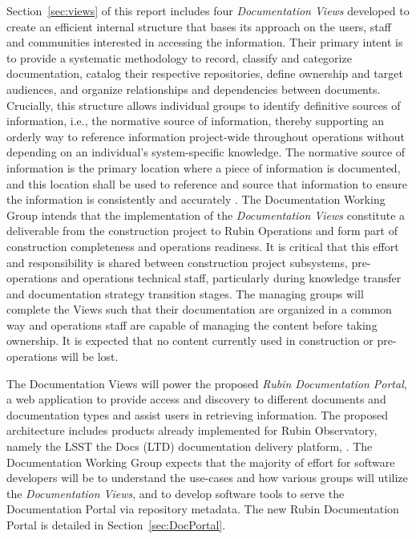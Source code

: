 Section~\ref{sec:views} of this report includes four \emph{Documentation Views} developed to create an efficient internal structure that bases its approach on the users, staff and communities interested in accessing the information.
Their primary intent is to provide a systematic methodology to record, classify and categorize documentation, catalog their respective repositories, define ownership and target audiences, and organize relationships and dependencies between documents.
Crucially, this structure allows individual groups to identify definitive sources of information, i.e., the normative source of information, thereby supporting an orderly way to reference information project-wide throughout operations without depending on an individual's system-specific knowledge.
The normative source of information is the primary location where a piece of information is documented, and this location shall be used to reference and source that information to ensure the information is consistently and accurately .
The Documentation Working Group intends that the implementation of the \emph{Documentation Views} constitute a deliverable from the construction project to Rubin Operations and form part of construction completeness and operations readiness.
It is critical that this effort and responsibility is shared between construction project subsystems, pre-operations and operations technical staff, particularly during knowledge transfer and documentation strategy transition stages.
The managing groups will complete the Views such that their documentation are organized in a common way and operations staff are capable of managing the content before taking ownership.
It is expected that no content currently used in construction or pre-operations will be lost.

The Documentation Views will power the proposed \emph{Rubin Documentation Portal}, a web application to provide access and discovery to different documents and documentation types and assist users in retrieving information.
The proposed architecture includes products already implemented for Rubin Observatory, namely the LSST the Docs (LTD) documentation delivery platform,  .
The Documentation Working Group expects that the majority of effort for software developers will be to understand the use-cases and how various groups will utilize the \emph{Documentation Views}, and to develop software tools to serve the Documentation Portal via repository metadata.
The new Rubin Documentation Portal is detailed in Section~\ref{sec:DocPortal}.

